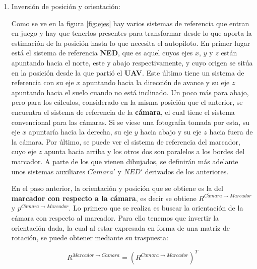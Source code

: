 \begin{enumerate}

\item Inversión de posición y orientación:
	\figEjes

	Como se ve en la figura \ref{fig:ejes} hay varios sistemas de referencia que entran en juego y hay que tenerlos presentes para transformar desde lo que aporta la estimación de la posición hasta lo que necesita el autopiloto. En primer lugar está el sistema de referencia \textbf{NED}, que es aquel cuyos ejes $x$, $y$ y $z$ están apuntando hacia el norte, este y abajo respectivamente, y cuyo origen se  sitúa en la posición desde la que partió el \textbf{UAV}. Este último tiene un sistema de referencia con su eje $x$ apuntando hacia la dirección de avance y su eje $z$ apuntando hacia el suelo cuando no está inclinado. Un poco más para abajo, pero para los cálculos, considerado en la misma posición que el anterior, se encuentra el sistema de referencia de la \textbf{cámara}, el cual tiene el sistema convencional para las cámaras. Si se viese una fotografía tomada por esta, su eje $x$ apuntaría hacia la derecha, su eje $y$ hacia abajo y su eje $z$ hacia fuera de la cámara. Por último, se puede ver el sistema de referencia del marcador, cuyo eje $z$ apunta hacia arriba y los otros dos son paralelos a los bordes del marcador. A parte de los que vienen dibujados, se definirán más adelante unos sistemas auxiliares $C\acute{a}mara'$ y $NED'$ derivados de los anteriores. 

	En el paso anterior, la orientación y posición que se obtiene es la del \textbf{marcador con respecto a la cámara}, es decir se obtiene $R^{C\acute{a}mara \rightarrow Marcador}$ y $p^{C\acute{a}mara \rightarrow Marcador}$. Lo primero que se realiza es buscar la orientación de la cámara con respecto al marcador. Para ello tenemos que invertir la orientación dada, la cual al estar expresada en forma de una matriz de rotación, se puede obtener mediante su traspuesta:

	\begin{equation}
	R^{Marcador \rightarrow C\acute{a}mara } = \left(R^{C\acute{a}mara \rightarrow Marcador}\right)^T
	\end{equation}



\end{enumerate}
